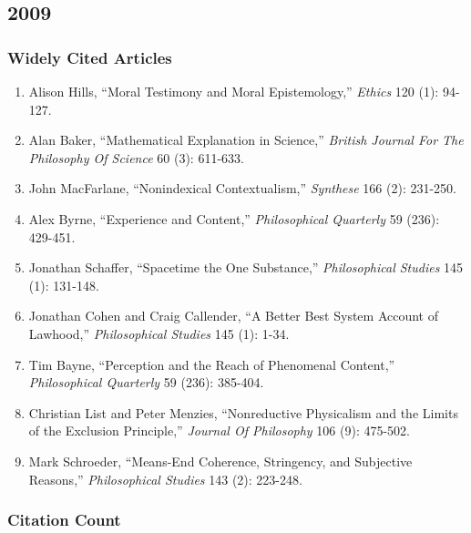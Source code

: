 \documentclass[
  10pt,
  letterpaper,
  DIV=11,
  numbers=noendperiod,
  twoside]{scrartcl}
\providecommand{\tightlist}{%
  \setlength{\itemsep}{0pt}\setlength{\parskip}{0pt}}\usepackage{longtable,booktabs,array}
\begin{document}
\newpage

\subsection{2009}\label{sec-s2009}

\subsubsection*{Widely Cited Articles}\label{widely-cited-articles-33}

\begin{enumerate}
\def\labelenumi{\arabic{enumi}.}
\tightlist
\item
  Alison Hills, ``Moral Testimony and Moral Epistemology,''
  \emph{Ethics} 120 (1): 94-127.
\item
  Alan Baker, ``Mathematical Explanation in Science,'' \emph{British
  Journal For The Philosophy Of Science} 60 (3): 611-633.
\item
  John MacFarlane, ``Nonindexical Contextualism,'' \emph{Synthese} 166
  (2): 231-250.
\item
  Alex Byrne, ``Experience and Content,'' \emph{Philosophical Quarterly}
  59 (236): 429-451.
\item
  Jonathan Schaffer, ``Spacetime the One Substance,''
  \emph{Philosophical Studies} 145 (1): 131-148.
\item
  Jonathan Cohen and Craig Callender, ``A Better Best System Account of
  Lawhood,'' \emph{Philosophical Studies} 145 (1): 1-34.
\item
  Tim Bayne, ``Perception and the Reach of Phenomenal Content,''
  \emph{Philosophical Quarterly} 59 (236): 385-404.
\item
  Christian List and Peter Menzies, ``Nonreductive Physicalism and the
  Limits of the Exclusion Principle,'' \emph{Journal Of Philosophy} 106
  (9): 475-502.
\item
  Mark Schroeder, ``Means-End Coherence, Stringency, and Subjective
  Reasons,'' \emph{Philosophical Studies} 143 (2): 223-248.
\end{enumerate}

\subsubsection*{Citation Count}\label{sec-count-2009}
\end{document}
